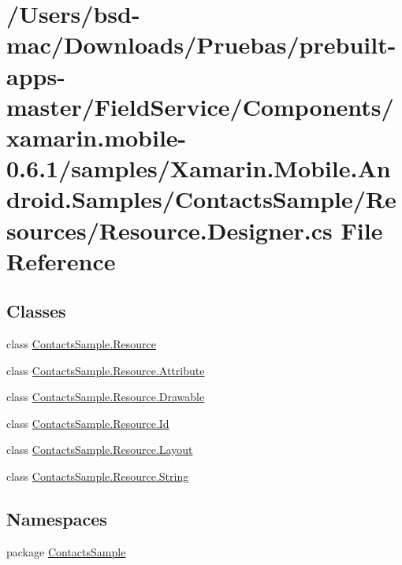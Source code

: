 \hypertarget{_components_2xamarin_8mobile-0_86_81_2samples_2_xamarin_8_mobile_8_android_8_samples_2_contacts_d56de22a85d1f6d80155675d1a06eae3}{\section{/\+Users/bsd-\/mac/\+Downloads/\+Pruebas/prebuilt-\/apps-\/master/\+Field\+Service/\+Components/xamarin.mobile-\/0.6.1/samples/\+Xamarin.Mobile.\+Android.\+Samples/\+Contacts\+Sample/\+Resources/\+Resource.Designer.\+cs File Reference}
\label{_components_2xamarin_8mobile-0_86_81_2samples_2_xamarin_8_mobile_8_android_8_samples_2_contacts_d56de22a85d1f6d80155675d1a06eae3}
}
\subsection*{Classes}
\begin{DoxyCompactItemize}
\item 
class \hyperlink{class_contacts_sample_1_1_resource}{Contacts\+Sample.\+Resource}
\item 
class \hyperlink{class_contacts_sample_1_1_resource_1_1_attribute}{Contacts\+Sample.\+Resource.\+Attribute}
\item 
class \hyperlink{class_contacts_sample_1_1_resource_1_1_drawable}{Contacts\+Sample.\+Resource.\+Drawable}
\item 
class \hyperlink{class_contacts_sample_1_1_resource_1_1_id}{Contacts\+Sample.\+Resource.\+Id}
\item 
class \hyperlink{class_contacts_sample_1_1_resource_1_1_layout}{Contacts\+Sample.\+Resource.\+Layout}
\item 
class \hyperlink{class_contacts_sample_1_1_resource_1_1_string}{Contacts\+Sample.\+Resource.\+String}
\end{DoxyCompactItemize}
\subsection*{Namespaces}
\begin{DoxyCompactItemize}
\item 
package \hyperlink{namespace_contacts_sample}{Contacts\+Sample}
\end{DoxyCompactItemize}
